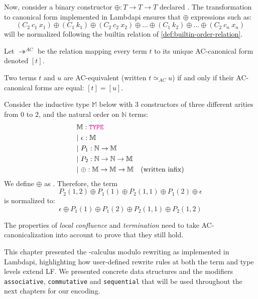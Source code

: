 Now, consider a binary constructor $\oplus: T \to T \to T$ declared .
The transformation to canonical form implemented in Lambdapi ensures that $\oplus$ expressions such as:
\[ (C_2~c_1~x_1) \oplus (C_1~k_1) \oplus (C_2~c_2~x_2) \oplus \dots \oplus (C_1~k_2) \oplus \dots \oplus (C_2~c_n~x_n) \]
will be normalized following the builtin relation of \cref{def:builtin-order-relation}.

\begin{definition}
Let $\twoheadrightarrow^{AC}$ be the relation mapping every term $t$ to its unique AC-canonical form denoted $[t]$.
\end{definition}

\begin{definition}[AC equivalence]
Two terms $t$ and $u$ are AC-equivalent (written $t \simeq_{AC} u$) if and only if their AC-canonical forms are equal: $[t] = [u]$.
\end{definition}

\begin{example}
Consider the inductive type $\mathbb{M}$ below with 3 constructors of three different arities from $0$ to $2$, and the natural order on $\mathbb{N}$ terms:
\begin{align*}
&\bb{M}: \type \\
&|~\epsilon : \bb{M} \\
&|~P_1: \N \ra \bb{M} \\
&|~P_2 : \N \ra \N \ra \bb{M} \\
&|~ \oplus : \bb{M} \to \bb{M} \to \bb{M} \quad \text{(written infix)}
\end{align*}
We define $\oplus$ as . Therefore, the term
\[
  P_2(1,2) \oplus P_1(1) \oplus P_2(1,1) \oplus P_1(2) \oplus \epsilon
\]
is normalized to:
\[
  \epsilon \oplus P_1(1) \oplus P_1(2) \oplus P_2(1,1) \oplus P_2(1,2)
\]
\end{example}

\begin{remark}
The properties of \emph{local confluence} and \emph{termination} need to take AC-canonicalization into account to prove that they still hold.
\end{remark}


This chapter presented the \lp{}-calculus modulo rewriting as implemented in Lambdapi, highlighting how user-defined rewrite rules at both the term and type levels extend LF.
We presented concrete data structures and the modifiers \texttt{associative}, \texttt{commutative} and \texttt{sequential} that will be used throughout the next chapters for our encoding.